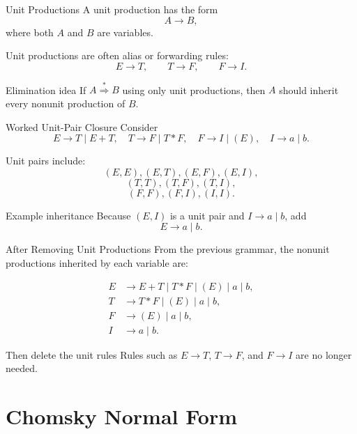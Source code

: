\documentclass[aspectratio=169,10pt]{beamer}
\newcommand{\ders}{\overset{*}{\Rightarrow}}
\begin{document}
\begin{frame}{Unit Productions}
\small
A \alert{unit production} has the form
\[
A\to B,
\]
where both \(A\) and \(B\) are variables.

Unit productions are often alias or forwarding rules:
\[
E\to T,
\qquad
T\to F,
\qquad
F\to I.
\]

\begin{block}{Elimination idea}
If \(A\ders B\) using only unit productions, then \(A\) should inherit every nonunit production of \(B\).
\end{block}
\end{frame}

\begin{frame}{Worked Unit-Pair Closure}
\small
Consider
\[
E\to T\mid E+T,
\quad
T\to F\mid T*F,
\quad
F\to I\mid(E),
\quad
I\to a\mid b.
\]

Unit pairs include:
\[
(E,E),(E,T),(E,F),(E,I),
\]
\[
(T,T),(T,F),(T,I),
\]
\[
(F,F),(F,I),(I,I).
\]

\begin{exampleblock}{Example inheritance}
Because \((E,I)\) is a unit pair and \(I\to a\mid b\), add
\[
E\to a\mid b.
\]
\end{exampleblock}
\end{frame}

\begin{frame}{After Removing Unit Productions}
\small
From the previous grammar, the nonunit productions inherited by each variable are:

\[
\begin{aligned}
E&\to E+T\mid T*F\mid(E)\mid a\mid b,\\
T&\to T*F\mid(E)\mid a\mid b,\\
F&\to (E)\mid a\mid b,\\
I&\to a\mid b.
\end{aligned}
\]

\begin{alertblock}{Then delete the unit rules}
Rules such as \(E\to T\), \(T\to F\), and \(F\to I\) are no longer needed.
\end{alertblock}
\end{frame}

\section{Chomsky Normal Form}
\end{document}
